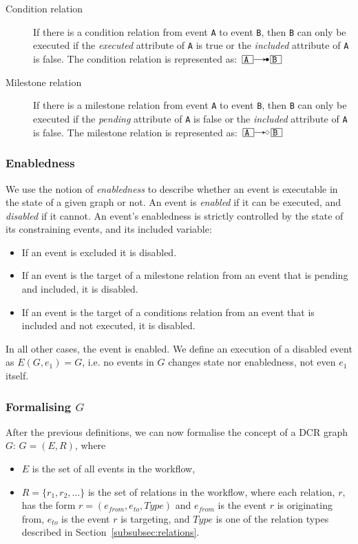 \documentclass{article}
\begin{document}
\begin{description}
				\begin{description}
					\item[Condition relation] If there is a condition relation from event \texttt{A} to event \texttt{B}, then \texttt{B} can only be executed if the \textit{executed} attribute of \texttt{A} is true or the \textit{included} attribute of \texttt{A} is false.
				The condition relation is represented as: $\ev{A} \crel \ev{B}$
					\item[Milestone relation] If there is a milestone relation from event \texttt{A} to event \texttt{B}, then \texttt{B} can only be executed if the \textit{pending} attribute of \texttt{A} is false or the \textit{included} attribute of \texttt{A} is false.
				The milestone relation is represented as: $\ev{A} \mrel \ev{B}$
				\end{description}
			\end{description}

			\subsubsection{Enabledness}

			We use the notion of \textit{enabledness} to describe whether an event is executable in the state of a given graph or not.
			An event is \textit{enabled} if it can be executed, and \textit{disabled} if it cannot.
			An event's enabledness is strictly controlled by the state of its constraining events, and its included variable:
			\begin{itemize}
				\item If an event is excluded it is disabled.
				\item If an event is the target of a milestone relation from an event that is pending and included, it is disabled.
				\item If an event is the target of a conditions relation from an event that is included and not executed, it is disabled.
			\end{itemize}
			In all other cases, the event is enabled.
			We define an execution of a disabled event as $E(G,e_1) = G$, i.e. no events in $G$ changes state nor enabledness, not even $e_1$ itself.

			\subsubsection{Formalising \texorpdfstring{$G$}{}}
			\label{subsubsec:formalising-g}

			After the previous definitions, we can now formalise the concept of a DCR graph $G$:
			$G = (E,R)$, where
			\begin{itemize}
				\item $E$ is the set of all events in the workflow,
				\item $R = \{r_1, r_2, \dots\}$ is the set of relations in the workflow, where each relation, $r$, has the form $r=(e_{from}, e_{to}, Type)$ and $e_{from}$ is the event $r$ is originating from, $e_{to}$ is the event $r$ is targeting, and $Type$ is one of the relation types described in Section~\ref{subsubsec:relations}.
			\end{itemize}
\end{document}
